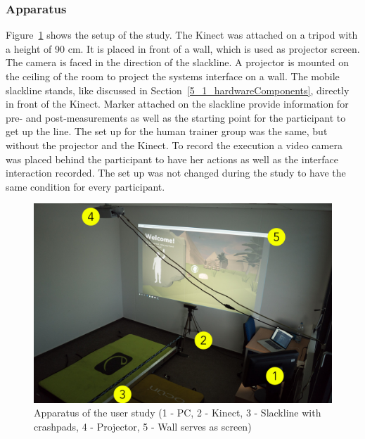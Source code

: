 \subsubsection{Apparatus}
Figure~\ref{fig:6_3_apparatus} shows the setup of the study.
The Kinect was attached on a tripod with a height of 90 cm.
It is placed in front of a wall, which is used as projector screen.
The camera is faced in the direction of the slackline.
A projector is mounted on the ceiling of the room to project the systems interface on a wall.
The mobile slackline stands, like discussed in Section~\ref{5_1_hardwareComponents}, directly in front of the Kinect.
Marker attached on the slackline provide information for pre- and post-measurements as well as the starting point for the participant to get up the line.
The set up for the human trainer group was the same, but without the projector and the Kinect.
To record the execution a video camera was placed behind the participant to have her actions as well as the interface interaction recorded.
The set up was not changed during the study to have the same condition for every participant.

\begin{figure}[htb]
	\centering
	\includegraphics[width=0.88\linewidth]{Pictures/6_3_apparatus}
	\caption{Apparatus of the user study (1 - PC, 2 - Kinect, 3 - Slackline with crashpads, 4 - Projector, 5 - Wall serves as screen)}
	\label{fig:6_3_apparatus}
\end{figure}

